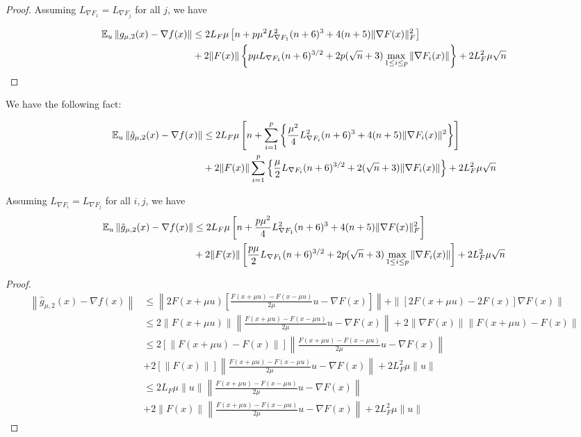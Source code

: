 \documentclass{article}
\begin{document}
\begin{theorem}
\begin{proof}
Assuming $L_{\nabla F_1} = L_{\nabla F_j}$ for all $j$, we have 

\begin{align}
\mathbb{E}_u\left\| g_{\mu,2}(x) - \nabla f(x) \right\| & \leq 2L_F\mu\left[n + p\mu^2 L_{\nabla F_1}^2(n+6)^3 + 4(n+5)\|\nabla F(x)\|_F^2\right] \notag \\ & + 2\|F(x)\|\left\{p\mu L_{\nabla F_1}(n+6)^{3/2} + 2p(\sqrt{n}+3)\max_{1 \leq i \leq p}\|\nabla F_i(x)\|\right\} + 2L_F^2\mu \sqrt{n}
\end{align}

\end{proof}

\end{theorem}


We have the following fact:

\begin{theorem}
\begin{align}
\mathbb{E}_u\left\| \hat{g}_{\mu,2}(x) - \nabla f(x) \right\| & \leq 2L_F\mu\left[n + \sum_{i=1}^p\left\{\frac{\mu^2}{4}L_{\nabla F_i}^2(n+6)^3 + 4(n+5)\|\nabla F_i(x)\|^2\right\}\right] \notag \\ & + 2\|F(x)\|\sum_{i=1}^p\left\{\frac{\mu}{2}L_{\nabla F_i}(n+6)^{3/2} + 2(\sqrt{n}+3)\|\nabla F_i(x)\|\right\} + 2L_F^2\mu\sqrt{n} 
\end{align}

Assuming $L_{\nabla F_i} = L_{\nabla F_j}$ for all $i,j$, we have 
\begin{align}
\mathbb{E}_u\left\| \hat{g}_{\mu,2}(x) - \nabla f(x) \right\| & \leq 2L_F\mu\left[n + \frac{p\mu^2}{4}L_{\nabla F_1}^2(n+6)^3 + 4(n+5)\|\nabla F(x)\|_F^2\right] \notag  \\ & + 2\|F(x)\|\left[\frac{p\mu}{2}L_{\nabla F_1}(n+6)^{3/2} + 2p(\sqrt{n} + 3)\max_{1 \leq i \leq p}\|\nabla F_i(x)\|\right] + 2L_F^2\mu\sqrt{n}
\end{align}

\begin{proof}
\begin{align*}
\left\| \hat{g}_{\mu,2}(x) - \nabla f(x) \right\| & \leq \left\|2F(x+\mu u)\left[\frac{F(x+\mu u)-F(x-\mu u)}{2\mu}u - \nabla F(x)\right]\right\| + \|[2F(x+\mu u)-2F(x)]\nabla F(x)\| \\ & \leq 2\|F(x+\mu u)\| \left\| \frac{F(x+\mu u)-F(x-\mu u)}{2\mu}u - \nabla F(x) \right\| + 2\|\nabla F(x)\| \|F(x+\mu u) - F(x)\| \\ & \leq  2[\|F(x+\mu u) - F(x)\|]\left\|\frac{F(x+\mu u) - F(x-\mu u)}{2\mu}u - \nabla F(x)\right\| \\ & + 2[\|F(x)\|]\left\|\frac{F(x+\mu u) - F(x-\mu u)}{2\mu}u - \nabla F(x)\right\| + 2L_F^2\mu \|u\| \\ & \leq 2L_F\mu\|u\|\left\|\frac{F(x+\mu u)-F(x-\mu u)}{2\mu}u - \nabla F(x)\right\| \\ & + 2\|F(x)\|\left\| \frac{F(x+\mu u)-F(x-\mu u)}{2\mu}u - \nabla F(x) \right\| + 2L_F^2\mu \|u\|
\end{align*}


\end{proof}
\end{theorem}
\end{document}
